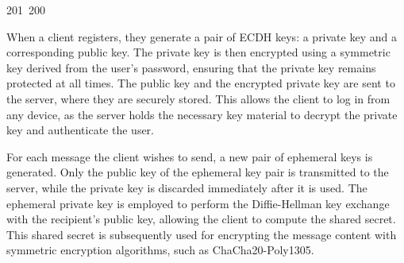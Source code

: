 201~200~\documentclass{article}
\begin{document}
	                                                                                                                                                                                                                                                                                                	                                                                                                                                        	    	                                                                                                	                                                                                                                                                                                                                                                When a client registers, they generate a pair of ECDH keys: a private key and a corresponding public key. The private key is then encrypted using a symmetric key derived from the user's password, ensuring that the private key remains protected at all times. The public key and the encrypted private key are sent to the server, where they are securely stored. This allows the client to log in from any device, as the server holds the necessary key material to decrypt the private key and authenticate the user.

	                                                                                                                                                                                                                                                                                                	                                                                                                                                        	    	                                                                                                	                                                                                                                                                                                                                                                For each message the client wishes to send, a new pair of ephemeral keys is generated. Only the public key of the ephemeral key pair is transmitted to the server, while the private key is discarded immediately after it is used. The ephemeral private key is employed to perform the Diffie-Hellman key exchange with the recipient's public key, allowing the client to compute the shared secret. This shared secret is subsequently used for encrypting the message content with symmetric encryption algorithms, such as ChaCha20-Poly1305.
\end{document}
